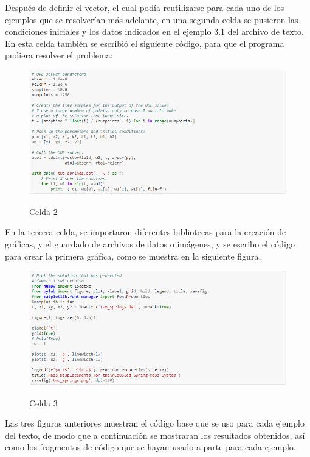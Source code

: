 \documentclass{article}
\begin{document}
Después de definir el vector, el cual podía reutilizarse para cada uno de los ejemplos que se resolverían más adelante, en una segunda celda se pusieron las condiciones iniciales y los datos indicados en el ejemplo 3.1 del archivo de texto. En esta celda también se escribió el siguiente código, para que el programa pudiera resolver el problema:
\begin{figure}[H]
    \caption{Celda 2}
    \includegraphics[width=1\textwidth]{Celda2.PNG}
    \centering
    \label{Cod}
\end{figure}
En la tercera celda, se importaron diferentes bibliotecas para la creación de gráficas, y el guardado de archivos de datos o imágenes, y se escribo el código para crear la primera gráfica, como se muestra en la siguiente figura.
\begin{figure}[H]
    \caption{Celda 3}
    \includegraphics[width=1\textwidth]{Celda3.PNG}
    \centering
    \label{Cod}
\end{figure}
Las tres figuras anteriores muestran el código base que se uso para cada ejemplo del texto, de modo que a continuación se mostraran los resultados obtenidos, así como los fragmentos de código que se hayan usado a parte para cada ejemplo.
\end{document}
